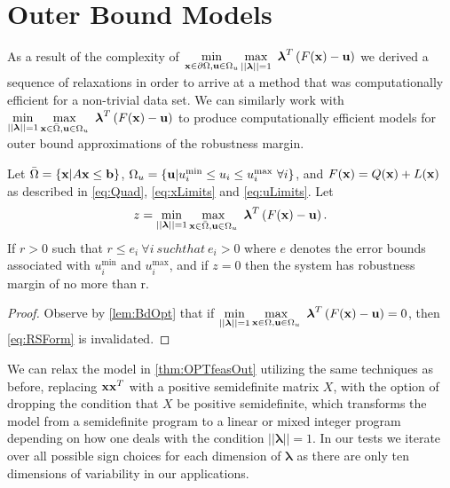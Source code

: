\section{Outer Bound Models} \label{sec:outbdform}  

As a result of the complexity of $\displaystyle \min\limits_{\vx\in \partial \Omega, \vu\in\Omega_u}\max\limits_{||\boldsymbol{\lambda}||=1 }\ \boldsymbol{\lambda}^T\left(F(\vx)-\vu\right)$ we derived a sequence of relaxations in order to arrive at a method that was computationally efficient for a non-trivial data set. 
We can similarly work with $\displaystyle \min\limits_{||\boldsymbol{\lambda}||=1}\max\limits_{\vx\in \bar{\Omega}, \vu\in\Omega_u}\ \boldsymbol{\lambda}^T\left(F(\vx)-\vu\right)$ to produce computationally efficient models for outer bound approximations of the robustness margin. 
\begin{thm}\label{thm:OPTfeasOut} 
Let $\bar{\Omega}=\{\mathbf{x}| A\mathbf{x}\leq \mathbf{b}\}$, $\Omega_{u}=\{\mathbf{u}| u^{\min}_i\leq u_i \leq u^{\max}_i \ \forall i \}$, and $F(\mathbf{x})=Q(\mathbf{x})+L(\mathbf{x})$ as described in \cref{eq:Quad}, \cref{eq:xLimits} and \cref{eq:uLimits}. 
Let
$$z = \min\limits_{||\boldsymbol{\lambda}||=1}\max\limits_{\vx\in \bar{\Omega}, \vu\in\Omega_u}\ \boldsymbol{\lambda}^T\left(F(\vx)-\vu\right).$$
If $r>0$ such that $r\leq e_i \ \forall i \ such that \ e_i>0$ where $e$ denotes the error bounds associated with $ u^{\min}_i$ and $ u^{\max}_i$, and if $z=0$ then the system has robustness margin of no more than r.

\begin{proof} 
  Observe by \cref{lem:BdOpt} that if $\min\limits_{||\boldsymbol{\lambda}||=1}\max\limits_{\vx\in \Omega, \vu\in\Omega_u}\ \boldsymbol{\lambda}^T\left(F(\vx)-\vu\right)=0$, then \cref{eq:RSForm} is invalidated.  

\end{proof}
\end{thm}

We can relax the model in \cref{thm:OPTfeasOut} utilizing the same techniques as before, replacing $\mathbf{x}\mathbf{x}^T$ with a positive semidefinite matrix $X$, with the option of dropping the condition that $X$ be positive semidefinite, which transforms the model from a semidefinite program to a linear or mixed integer program depending on how one deals with the condition $||\boldsymbol{\lambda}||=1$. 
In our tests we iterate over all possible sign choices for each dimension of $\boldsymbol{\lambda}$ as there are only ten dimensions of variability in our applications. \\

